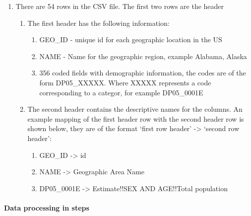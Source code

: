\documentclass[
]{article}
\providecommand{\tightlist}{%
  \setlength{\itemsep}{0pt}\setlength{\parskip}{0pt}}
\begin{document}
\begin{enumerate}
\def\labelenumi{\arabic{enumi}.}
\tightlist
\item
  There are 54 rows in the CSV file. The first two rows are the header

  \begin{enumerate}
  \def\labelenumii{\arabic{enumii}.}
  \tightlist
  \item
    The first header has the following information:

    \begin{enumerate}
    \def\labelenumiii{\arabic{enumiii}.}
    \tightlist
    \item
      GEO\_ID - unique id for each geographic location in the US
    \item
      NAME - Name for the geographic region, example Alabama, Alaska
    \item
      356 coded fields with demographic information, the codes are of
      the form DP05\_XXXXX. Where XXXXX represents a code corresponding
      to a categor, for example DP05\_0001E
    \end{enumerate}
  \item
    The second header contains the descriptive names for the columns. An
    example mapping of the first header row with the second header row
    is shown below, they are of the format `first row header'
    -\textgreater{} `second row header':

    \begin{enumerate}
    \def\labelenumiii{\arabic{enumiii}.}
    \setcounter{enumiii}{3}
    \tightlist
    \item
      GEO\_ID -\textgreater{} id
    \item
      NAME -\textgreater{} Geographic Area Name\\
    \item
      DP05\_0001E -\textgreater{} Estimate!!SEX AND AGE!!Total
      population
    \end{enumerate}
  \end{enumerate}
\end{enumerate}

\hypertarget{data-processing-in-steps-1}{%
\paragraph{Data processing in steps}\label{data-processing-in-steps-1}}
\end{document}
